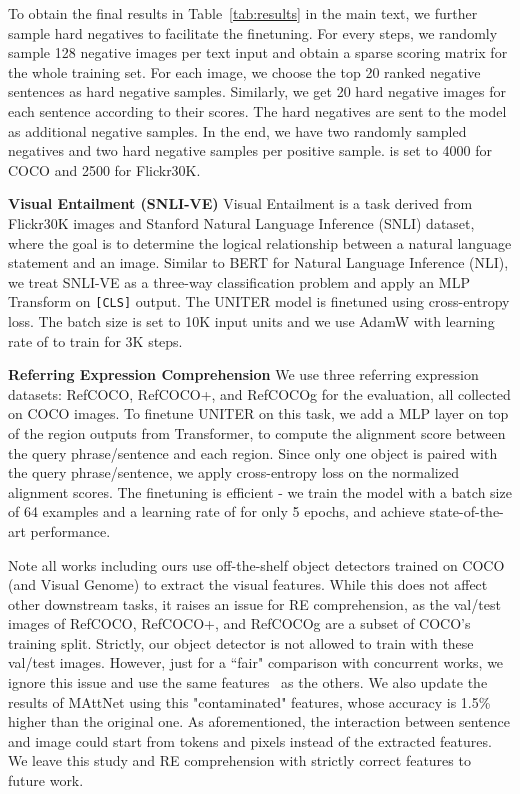 \documentclass[runningheads]{llncs}
\begin{document}
To obtain the final results in Table~\ref{tab:results} in the main text, we further sample hard negatives to facilitate the finetuning. For every  steps, we randomly sample 128 negative images per text input and obtain a sparse scoring matrix for the whole training set. For each image, we choose the top 20 ranked negative sentences as hard negative samples. Similarly, we get 20 hard negative images for each sentence according to their scores. The hard negatives are sent to the model as additional negative samples. In the end, we have two randomly sampled negatives and two hard negative samples per positive sample.  is set to 4000 for COCO and 2500 for Flickr30K. 

\vspace{5pt}
\noindent \textbf{Visual Entailment (SNLI-VE)}
Visual Entailment is a task derived from Flickr30K images and Stanford Natural Language Inference (SNLI) dataset, where the goal is to determine the logical relationship between a natural language statement and an image.
Similar to BERT for Natural Language Inference (NLI), we treat SNLI-VE as a three-way classification problem and apply an MLP Transform on \texttt{[CLS]} output. 
The UNITER model is finetuned using cross-entropy loss. The batch size is set to 10K input units and we use AdamW with learning rate of  to train for 3K steps.

\vspace{5pt}
\noindent \textbf{Referring Expression Comprehension}
We use three referring expression datasets: RefCOCO, RefCOCO+, and RefCOCOg for the evaluation, all collected on COCO images.
To finetune UNITER on this task, we add a MLP layer on top of the region outputs from Transformer, to compute the alignment score between the query phrase/sentence and each region.
Since only one object is paired with the query phrase/sentence, we apply cross-entropy loss on the normalized alignment scores.
The finetuning is efficient - we train the model with a batch size of 64 examples and a learning rate of  for only 5 epochs, and achieve state-of-the-art performance.

Note all works including ours use off-the-shelf object detectors trained on COCO (and Visual Genome) to extract the visual features.
While this does not affect other downstream tasks, it raises an issue for RE comprehension, as the val/test images of RefCOCO, RefCOCO+, and RefCOCOg are a subset of COCO's training split.
Strictly, our object detector is not allowed to train with these val/test images.
However, just for a ``fair" comparison with concurrent works, we ignore this issue and use the same features~\cite{anderson2018bottom} as the others. 
We also update the results of MAttNet using this "contaminated" features, whose accuracy is 1.5\% higher than the original one.
As aforementioned, the interaction between sentence and image could start from tokens and pixels instead of the extracted features.
We leave this study and RE comprehension with strictly correct features to future work.
\end{document}

